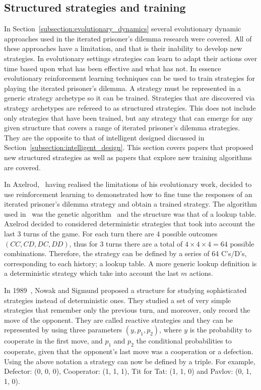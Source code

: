 \documentclass{article}
\theoremstyle{definition}
\begin{document}
\subsection{Structured strategies and training}
\label{section:structured_strategies}

In Section~\ref{subsection:evolutionary_dynamics} several evolutionary
dynamic approaches used in the iterated prisoner's dilemma research were covered.
All of these approaches have a limitation, and that is their inability to develop
new strategies. In evolutionary settings strategies can learn to adapt their
actions over time based upon what has been effective and what has not. In
essence evolutionary reinforcement learning techniques can be used to train strategies for playing
the iterated prisoner's dilemma. A strategy must be represented in a generic strategy
archetype so it can be trained. Strategies that are discovered via strategy archetypes
are refereed to as structured strategies. This does not include only strategies
that have been trained, but any strategy that can emerge for any given structure
that covers a range of iterated prisoner's dilemma strategies. They are the opposite
to that of intelligent designed discussed in Section~\ref{subsection:intelligent_design}.
This section covers papers that proposed new structured strategies as well as
papers that explore new training algorithms are covered.

In Axelrod,~\cite{Axelrod1987} having realised the limitations of his evolutionary
work, decided to use reinforcement learning to demonstrated how to fine tune the
responses of an iterated prisoner's dilemma strategy and obtain a trained strategy.
The algorithm used in~\cite{Axelrod1987} was the genetic algorithm~\cite{Hoffmann1998}
and the structure was that of a lookup table. 
Axelrod decided to considered deterministic strategies that took into account
the last 3 turns of the game. For each turn there are 4 possible outcomes
\((CC, CD, DC, DD)\), thus for 3 turns there are a total of \(4\times4\times4=64\)
possible combinations. Therefore, the strategy can be defined by a series of
64 C's/D's, corresponding to each history; a lookup table.
A more generic lookup definition is a deterministic strategy which take into account
the last \(m\) actions.

In 1989~\cite{nowak1989}, Nowak and Sigmund proposed a structure for studying
sophisticated strategies instead of deterministic ones. They studied
a set of very simple strategies that remember only the previous
turn, and moreover, only record the move of the opponent. They are called reactive
strategies and they can be represented by using three parameters \((y, p_1, p_2)\), where \(y\) is the
probability to cooperate in the first move, and \(p_1\) and \(p_2\) the conditional probabilities
to cooperate, given that the opponent's last move was a cooperation or a defection.
Using the above notation a strategy can now be defined by a triple. For example,
Defector: (0, 0, 0), Cooperator: (1, 1, 1), Tit for Tat: (1, 1, 0) and Pavlov: (0, 1, 1, 0).
\end{document}
